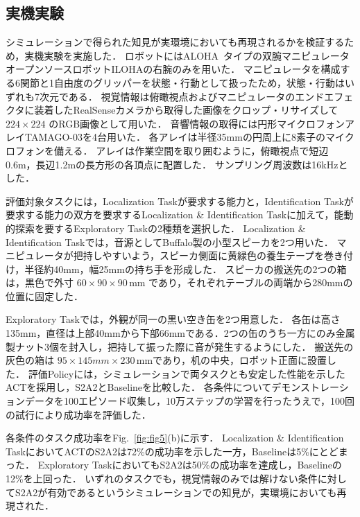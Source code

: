 \documentclass{article}
\begin{document}






\subsection{実機実験}
\label{sec:real}
	シミュレーションで得られた知見が実環境においても再現されるかを検証するため，実機実験を実施した．
	ロボットにはALOHA~\citep{act}タイプの双腕マニピュレータオープンソースロボットILOHAの右腕のみを用いた．
	マニピュレータを構成する6関節と1自由度のグリッパーを状態・行動として扱ったため，状態・行動はいずれも7次元である．
	視覚情報は俯瞰視点およびマニピュレータのエンドエフェクタに装着したRealSenseカメラから取得した画像をクロップ・リサイズして $224\times224$ のRGB画像として用いた．
	音響情報の取得には円形マイクロフォンアレイTAMAGO-03を4台用いた．
	各アレイは半径35mmの円周上に8素子のマイクロフォンを備える．
	アレイは作業空間を取り囲むように，俯瞰視点で短辺0.6m，長辺1.2mの長方形の各頂点に配置した．
	サンプリング周波数は16kHzとした．

	評価対象タスクには，Localization Taskが要求する能力と，Identification Taskが要求する能力の双方を要求するLocalization \& Identification Taskに加えて，能動的探索を要するExploratory Taskの2種類を選択した．
	Localization \& Identification Taskでは，音源としてBuffalo製の小型スピーカを2つ用いた．
	マニピュレータが把持しやすいよう，スピーカ側面に黄緑色の養生テープを巻き付け，半径約40mm，幅25mmの持ち手を形成した．
	スピーカの搬送先の2つの箱は，黒色で外寸 $60\times90\times90$\,mm であり，それぞれテーブルの両端から280mmの位置に固定した．
	
	Exploratory Taskでは，外観が同一の黒い空き缶を2つ用意した．
	各缶は高さ135mm，直径は上部40mmから下部66mmである．2つの缶のうち一方にのみ金属製ナット3個を封入し，把持して振った際に音が発生するようにした．
	搬送先の灰色の箱は $95\times145mm\times230$\,mmであり，机の中央，ロボット正面に設置した．
	評価Policyには，シミュレーションで両タスクとも安定した性能を示したACTを採用し，S2A2とBaselineを比較した．
	各条件についてデモンストレーションデータを100エピソード収集し，10万ステップの学習を行ったうえで，100回の試行により成功率を評価した．

	各条件のタスク成功率をFig.~\ref{fig:fig5}(b)に示す．
	Localization \& Identification TaskにおいてACTのS2A2は72\%の成功率を示した一方，Baselineは5\%にとどまった．
	Exploratory TaskにおいてもS2A2は50\%の成功率を達成し，Baselineの12\%を上回った．
	いずれのタスクでも，視覚情報のみでは解けない条件に対してS2A2が有効であるというシミュレーションでの知見が，実環境においても再現された．
\end{document}
